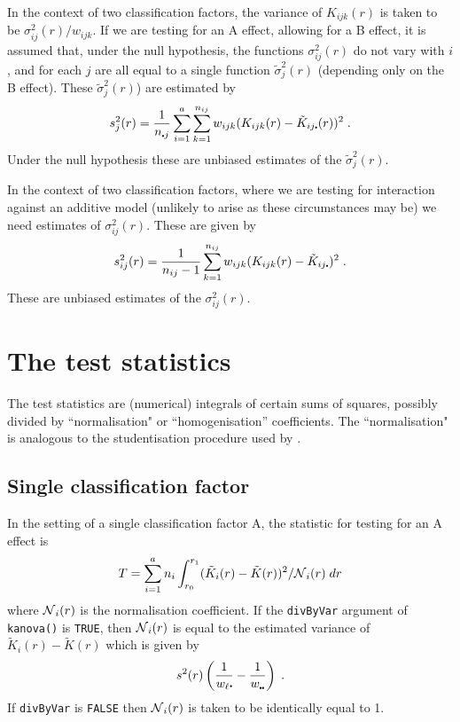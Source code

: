 \documentclass[12pt]{article}
\newcommand{\pt}{\mbox{\scalebox{0.4}{$\bullet$}}}
\newcommand{\sco}{\mbox{$\cal N$}}
\begin{document}
In the context of two classification factors, the variance of
$K_{ijk}(r)$ is taken to be $\sigma_{ij}^2(r)/w_{ijk}$.  If we
are testing for an A effect, allowing for a B effect, it is assumed
that, under the null hypothesis, the functions $\sigma_{ij}^2(r)$
do not vary with $i$, and for each $j$ are all equal to a single
function $\tilde{\sigma}_j^2(r)$ (depending only on the B effect).  These
$\tilde{\sigma}^2_j(r)$) are estimated by
\[
s^2_j(r) = \frac{1}{n_{\pt j}} \sum_{i=1}^a \sum_{k=1}^{n_{ij}}
                               w_{ijk}(K_{ijk}(r) - \tilde{K}_{ij\pt}(r))^2 \; .
\]
Under the null hypothesis these are unbiased estimates of the $\tilde{\sigma}^2_j(r)$.

In the context of two classification factors, where we are testing for
interaction against an additive model (unlikely to arise as these circumstances
may be) we need estimates of $\sigma^2_{ij}(r)$.  These are given by
\[
s^2_{ij}(r) = \frac{1}{n_{ij} - 1} \sum_{k=1}^{n_{ij}} w_{ijk}(K_{ijk}(r)
                                            - \tilde{K}_{ij\pt})^2 \; .
\]
These are unbiased estimates of the $\sigma^2_{ij}(r)$.

\section{The test statistics}
\label{sec:teststats}

The test statistics are (numerical) integrals of certain sums of
squares, possibly divided by ``normalisation" or ``homogenisation''
coefficients.  The ``normalisation" is analogous to the
studentisation procedure used by \cite{Hahn2012}.

\subsection{Single classification factor}
\label{sec:teststats.scf}

In the setting of a single classification factor A, the statistic
for testing for an A effect is
\[
T = \sum_{i=1}^a n_i \int_{r_0}^{r_1} (\tilde{K}_i(r) - 
                 \tilde{K}(r))^2/\sco_i(r) \; dr
\]
where $\sco_i(r)$ is the normalisation coefficient.  If the
\texttt{divByVar} argument of \texttt{kanova()} is \texttt{TRUE},
then $\sco_i(r)$ is equal to the estimated variance of $\tilde{K}_i(r)
- \tilde{K}(r)$ which is given by
\[
s^2(r) \left ( \frac{1}{w_\ell \pt} - \frac{1}{w_{\pt \pt}} \right ) \; .
\]
If \texttt{divByVar} is \texttt{FALSE} then $\sco_i(r)$ is taken to
be identically equal to 1.
\end{document}
